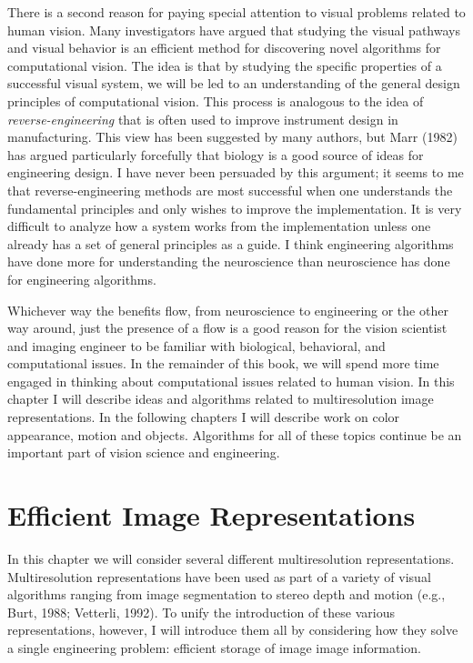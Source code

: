 There is a second reason for paying special attention to visual
problems related to human vision.  Many investigators have argued that
studying the visual pathways and visual behavior is an efficient
method for discovering novel algorithms for computational vision.  The
idea is that by studying the specific properties of a successful visual
system, we will be led to an understanding of the general design
principles of computational vision.  This process is analogous to the
idea of {\em reverse-engineering } that is often used to improve
instrument design in manufacturing.  This view has been suggested by
many authors, but Marr (1982) has argued particularly forcefully that
biology is a good source of ideas for engineering design.  I have
never been persuaded by this argument; it seems to me that
reverse-engineering methods are most successful when one understands
the fundamental principles and only wishes to improve the
implementation.  It is very difficult to analyze how a system works
from the implementation unless one already has a set of general
principles as a guide.  I think engineering algorithms have done more
for understanding the neuroscience than neuroscience has done for
engineering algorithms.

Whichever way the benefits flow, from neuroscience to engineering or
the other way around, just the presence of a flow is a good reason for
the vision scientist and imaging engineer to be familiar with
biological, behavioral, and computational issues.  In the remainder of
this book, we will spend more time engaged in thinking about
computational issues related to human vision.  In this chapter I will
describe ideas and algorithms related to multiresolution image
representations.  In the following chapters I will describe work on
color appearance, motion and objects.  Algorithms for all of these
topics continue be an important part of vision science and
engineering.

\section{Efficient Image Representations}
\label{sec6:efficient} In this chapter we will consider several
different multiresolution representations.  Multiresolution
representations have been used as part of a variety of visual
algorithms ranging from image segmentation to stereo depth and motion
(e.g., Burt, 1988; Vetterli, 1992).  To unify the introduction of
these various representations, however, I will introduce them all by
considering how they solve a single engineering problem: efficient
storage of image image information.

